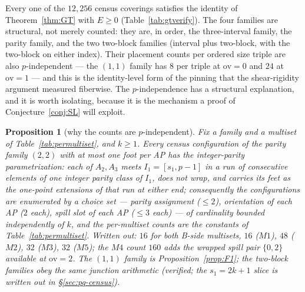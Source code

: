 \documentclass[11pt,a4paper]{article}
\numberwithin{equation}{section}
\theoremstyle{plain}
\theoremstyle{plain}
\newtheorem{proposition}[theorem]{Proposition}
\theoremstyle{definition}
\theoremstyle{remark}
\begin{document}
Every one of the $12{,}256$ census coverings satisfies the identity of
Theorem~\ref{thm:GT} with $E\ge0$ (Table~\ref{tab:gtverify}). The four
families are structural, not merely counted: they are, in order, the
three-interval family, the parity family, and the two two-block families
(interval plus two-block, with the two-block on either index). Their
placement counts per ordered size triple are also $p$-independent --- the
$(1,1)$ family has $8$ per triple at $\mathrm{ov}=0$ and $24$ at
$\mathrm{ov}=1$ --- and this is the identity-level form of the pinning that
the shear-rigidity argument measured fiberwise. The $p$-independence has a
structural explanation, and it is worth isolating, because it is the
mechanism a proof of Conjecture~\ref{conj:SL} will exploit.

\begin{proposition}[why the counts are $p$-independent]\label{prop:pindep}
Fix a family and a multiset of Table~\ref{tab:permultiset}, and $k\ge1$.
Every census configuration of the parity family $(2,2)$ with at most one
foot per AP has the \emph{integer-parity parametrization}: each of $A_2,
A_3$ meets $I_1=[s_1,p-1]$ in a run of consecutive elements of one integer
parity class of $I_1$, does not wrap, and carries its feet as the one-point
extensions of that run at either end; consequently the configurations are
enumerated by a choice set --- parity assignment ($\le2$), orientation of
each AP ($2$ each), spill slot of each AP ($\le3$ each) --- of cardinality
bounded independently of $k$, and the per-multiset counts are the constants
of Table~\ref{tab:permultiset}. Written out: $16$ for both B-side
multisets, $16$ ($M1$), $48$ ($M2$), $32$ ($M3$), $32$ ($M5$); the $M4$
count $160$ adds the wrapped spill pair $\{0,2\}$ available at
$\mathrm{ov}=2$. The $(1,1)$ family is Proposition~\ref{prop:F1}; the
two-block families obey the same junction arithmetic (verified; the
$s_1=2k{+}1$ slice is written out in \S\ref{sec:pq-census}).
\end{proposition}
\end{document}
